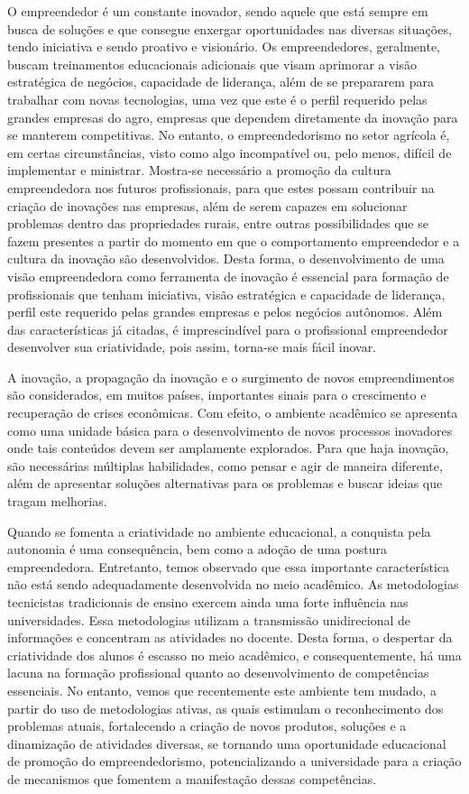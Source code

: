 O empreendedor é um constante inovador, sendo aquele que está sempre em busca de soluções e que consegue enxergar oportunidades nas diversas situações, tendo iniciativa e sendo proativo e visionário. Os empreendedores, geralmente, buscam treinamentos educacionais adicionais que visam aprimorar a visão estratégica de negócios, capacidade de liderança, além de se prepararem para trabalhar com novas tecnologias, uma vez que este é o perfil requerido pelas grandes empresas do agro, empresas que dependem diretamente da inovação para se manterem competitivas. No entanto, o empreendedorismo no setor agrícola é, em certas circunstâncias, visto como algo incompatível ou, pelo menos, difícil de implementar e ministrar. Mostra-se necessário a promoção da cultura empreendedora nos futuros profissionais, para que estes possam contribuir na criação de inovações nas empresas, além de serem capazes em solucionar problemas dentro das propriedades rurais, entre outras possibilidades que se fazem presentes a partir do momento em que o comportamento empreendedor e a cultura da inovação são desenvolvidos. Desta forma, o desenvolvimento de uma visão empreendedora como ferramenta de inovação é essencial para formação de profissionais que tenham iniciativa, visão estratégica e capacidade de liderança, perfil este requerido pelas grandes empresas e pelos negócios autônomos. Além das características já citadas, é imprescindível para o profissional empreendedor desenvolver sua criatividade, pois assim, torna-se mais fácil inovar. 

A inovação, a propagação da inovação e o surgimento de novos empreendimentos são considerados, em muitos países, importantes sinais para o crescimento e recuperação de crises econômicas. Com efeito, o ambiente acadêmico se apresenta como uma unidade básica para o desenvolvimento de novos processos inovadores onde tais conteúdos devem ser amplamente explorados. Para que haja inovação, são necessárias múltiplas habilidades, como pensar e agir de maneira diferente, além de apresentar soluções alternativas para os problemas e buscar ideias que tragam melhorias. 

Quando se fomenta a criatividade no ambiente educacional, a conquista pela autonomia é uma consequência, bem como a adoção de uma postura empreendedora. Entretanto, temos observado que essa importante característica não está sendo adequadamente desenvolvida no meio acadêmico. As metodologias tecnicistas tradicionais de ensino exercem ainda uma forte influência nas universidades. Essa metodologias utilizam a transmissão unidirecional de informações e concentram as atividades no docente. Desta forma, o despertar da criatividade dos alunos é escasso no meio acadêmico, e consequentemente, há uma lacuna na formação profissional quanto ao desenvolvimento de competências essenciais. No entanto, vemos que recentemente este ambiente tem mudado, a partir do uso de metodologias ativas, as quais estimulam o reconhecimento dos problemas atuais, fortalecendo a criação de novos produtos, soluções e a dinamização de atividades diversas, se tornando uma oportunidade educacional de promoção do empreendedorismo, potencializando a universidade para a criação de mecanismos que fomentem a manifestação dessas competências.

